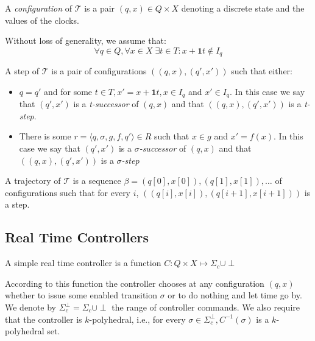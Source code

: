 \documentclass[table]{beamer}
\newcommand{\confPair}{\ensuremath{((q,x),(q',x'))}}
\begin{document}
\begin{frame}
	A \emph{configuration} of $\mathcal{T}$ is a pair $(q,x) \in Q \times X$ denoting a discrete
	state and the values of the clocks.

	\medskip

	Without loss of generality, we assume that:
	$$ \forall q \in Q, \forall x \in X \; \exists t \in T : x+\textbf{1}t \not \in I_q$$
\end{frame}
\begin{frame}
	\begin{dfn}
		A step of $\mathcal{T}$ is a pair of configurations $\confPair$ such that either:
		\begin{itemize}
			\item $q=q'$ and for some $t \in T, x'=x+\textbf{1}t, x \in I_q$ and $x' \in I_q$. In this case we say that $(q',x')$ is a \emph{t-successor} of $(q,x)$ and that $\confPair$ is a \emph{t-step}.
			\item There is some $r = \langle q,\sigma,g,f,q'\rangle \in R$ such that $x \in g$ and $x' = f(x)$. In this case we say that $(q',x')$ is a \emph{$\sigma$-successor} of $(q,x)$ and that $\confPair$ is a \emph{$\sigma$-step} 
		\end{itemize}
		
		\medskip
		
		A trajectory of $\mathcal{T}$ is a sequence $ \beta = (q[0],x[0]),(q[1],x[1]),\ldots $ of configurations such that for every $i$, $((q[i],x[i]),(q[i+1],x[i+1]))$ is a step.
	\end{dfn}
\end{frame}

\subsection{Real Time Controllers}
\begin{frame}
	\begin{dfn}
		A simple real time controller is a function $C: Q \times X \mapsto \Sigma_c \cup {\perp}$
	\end{dfn}
	According to this function the controller chooses at any configuration $(q,x)$ whether to issue some enabled transition $\sigma$ or to do nothing and let time go by. We denote by $\Sigma_c^\perp = \Sigma_c \cup {\perp}$ the range of controller commands. We also require that the controller is $k$-polyhedral, i.e., for every $\sigma \in \Sigma_c^\perp, C^{-1}(\sigma)$ is  a $k$-polyhedral set.
\end{frame}
\end{document}
